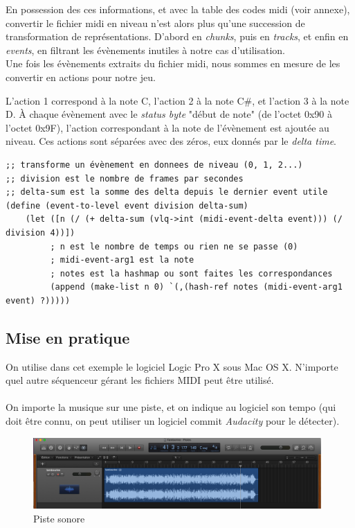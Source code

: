 En possession des ces informations, et avec la table des codes midi (voir annexe), convertir le fichier midi en niveau n'est alors plus qu'une succession de transformation de représentations. D'abord en \textit{chunks}, puis en \textit{tracks}, et enfin en \textit{events}, en filtrant les évènements inutiles à notre cas d'utilisation.\\
Une fois les évènements extraits du fichier midi, nous sommes en mesure de les convertir en actions pour notre jeu.

L'action 1 correspond à la note C, l'action 2 à la note C\#, et l'action 3 à la note D.
À chaque évènement avec le \textit{status byte} "début de note" (de l'octet 0x90 à l'octet 0x9F), l'action correspondant à la note de l'évènement est ajoutée au niveau. Ces actions sont séparées avec des zéros, eux donnés par le \textit{delta time}.\\

\begin{lstlisting}[style=Scheme]
;; transforme un évènement en donnees de niveau (0, 1, 2...)
;; division est le nombre de frames par secondes
;; delta-sum est la somme des delta depuis le dernier event utile
(define (event-to-level event division delta-sum)
    (let ([n (/ (+ delta-sum (vlq->int (midi-event-delta event))) (/ division 4))])
         ; n est le nombre de temps ou rien ne se passe (0)
         ; midi-event-arg1 est la note
         ; notes est la hashmap ou sont faites les correspondances
         (append (make-list n 0) `(,(hash-ref notes (midi-event-arg1 event) ?)))))
\end{lstlisting}


\subsection{Mise en pratique}
On utilise dans cet exemple le logiciel Logic Pro X sous Mac OS X. N'importe quel autre séquenceur gérant les fichiers MIDI peut être utilisé.\\

\paragraph{}
On importe la musique sur une piste, et on indique au logiciel son tempo (qui doit être connu, on peut utiliser un logiciel commit \textit{Audacity} pour le détecter).

\begin{figure}[H]\centering
  \includegraphics[width=11cm]{./img/logic_sound.png}
  \caption{Piste sonore}
\end{figure}

